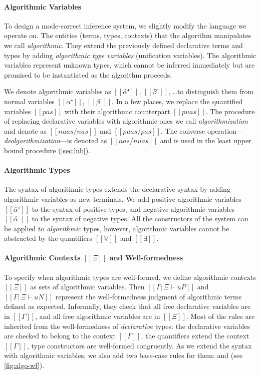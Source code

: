 \paragraph*{Algorithmic Variables}
To design a mode-correct inference system, we slightly modify the language we operate on.
The entities (terms, types, contexts) that the algorithm manipulates we call \emph{algorithmic}. 
They extend the previously defined declarative terms and types by adding 
\emph{algorithmic type variables} (\aka unification variables). 
The algorithmic variables represent unknown types, 
which cannot be inferred immediately but are promised to be instantiated
as the algorithm proceeds.

We denote algorithmic variables as $[[α̂⁺]]$, $[[β̂⁻]]$, \dots to distinguish
them from normal variables $[[α⁺]]$, $[[β⁻]]$. In a few places, we replace the
quantified variables $[[pas]]$ with their algorithmic counterpart $[[puas]]$.
The procedure of replacing declarative variables with algorithmic ones we call
\emph{algorithmization} and denote as $[[ nuas/nas ]]$ and $[[ puas/pas ]]$. The
converse operation---\emph{dealgorithmization}---is denoted as $[[ nas/nuas ]]$ and 
is used in the least upper bound procedure (\cref{sec:lub}).

\paragraph*{Algorithmic Types}
The syntax of algorithmic types extends the declarative syntax by adding
algorithmic variables as new terminals. We add positive algorithmic variables $[[α̂⁺]]$ 
to the syntax of positive types, and negative algorithmic variables $[[α̂⁻]]$ to the 
syntax of negative types. All the constructors of the system can be applied 
to \emph{algorithmic} types, however, algorithmic variables cannot be abstracted by the
quantifiers $[[∀]]$ and $[[∃]]$.

\paragraph*{Algorithmic Contexts $[[Ξ]]$ and Well-formedness}
To specify when algorithmic types are well-formed, we define algorithmic
contexts $[[Ξ]]$ as sets of algorithmic variables. Then
$[[Γ ; Ξ ⊢ uP]]$ and $[[Γ ; Ξ ⊢ uN]]$ represent the well-formedness judgment of
algorithmic terms defined as expected. Informally, they check that all free
declarative variables are in $[[Γ]]$, and all free algorithmic variables are in
$[[Ξ]]$. Most of the rules are inherited from the well-formedness of
\emph{declarative} types: the declarative variables are checked to belong to the
context $[[Γ]]$, the quantifiers extend the context $[[Γ]]$, type constructors are
well-formed congruently. As we extend the syntax with algorithmic variables, we
also add two base-case rules for them:  and
 (see \cref{fig:algo-wf}).

